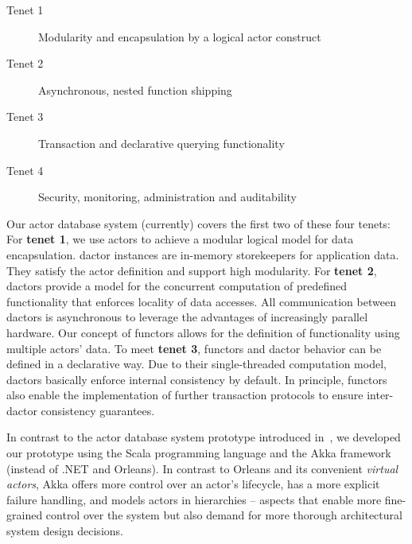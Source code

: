   \begin{description}
    \item[Tenet 1] Modularity and encapsulation by a logical actor construct
    \item[Tenet 2] Asynchronous, nested function shipping
    \item[Tenet 3] Transaction and declarative querying functionality
    \item[Tenet 4] Security, monitoring, administration and auditability
  \end{description}

  Our actor database system (currently) covers the first two of these four tenets:
  For \textbf{tenet 1}, we use actors to achieve a modular logical model for data encapsulation.
  \Gls{dactor} instances are in-memory storekeepers for application data.
  They satisfy the actor definition and support high modularity.
  For \textbf{tenet 2}, \glspl{dactor} provide a model for the concurrent computation of predefined functionality that enforces locality of data accesses.
  All communication between \glspl{dactor} is asynchronous to leverage the advantages of increasingly parallel hardware.
  Our concept of \glspl{functor} allows for the definition of functionality using multiple actors' data.
  To meet \textbf{tenet 3}, \glspl{functor} and \gls{dactor} behavior can be defined in a declarative way.
  Due to their single-threaded computation model, \glspl{dactor} basically enforce internal consistency by default.
  In principle, \glspl{functor} also enable the implementation of further transaction protocols to ensure inter-\gls{dactor} consistency guarantees.

  In contrast to the actor database system prototype introduced in~\cite{manifesto}, we developed our prototype using the Scala programming language and the Akka framework (instead of .NET and Orleans).
  In contrast to Orleans and its convenient \emph{virtual actors}, Akka offers more control over an actor's lifecycle, has a more explicit failure handling, and models actors in hierarchies -- aspects that enable more fine-grained control over the system but also demand for more thorough architectural system design decisions.

